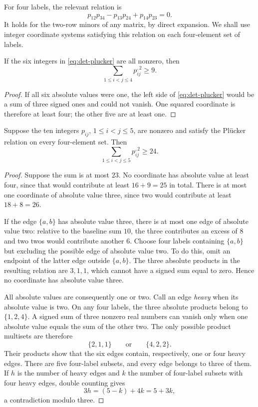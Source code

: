For four labels, the relevant relation is
\begin{equation}
 p_{12}p_{34}-p_{13}p_{24}+p_{14}p_{23}=0.
 \label{eq:det-plucker}
\end{equation}
It holds for the two-row minors of any matrix, by direct expansion.
We shall use integer coordinate systems satisfying this relation on
each four-element set of labels.

\begin{lemma}
\label{lem:det-four}
If the six integers in \eqref{eq:det-plucker} are all nonzero, then
\[
 \sum_{1\le i<j\le4}p_{ij}^{,2}\ge9.
\]
\end{lemma}
\begin{proof}
If all six absolute values were one, the left side of
\eqref{eq:det-plucker} would be a sum of three signed ones and could
not vanish. One squared coordinate is therefore at least four; the
other five are at least one.
\end{proof}

\begin{lemma}
\label{lem:det-five}
Suppose the ten integers $p_{ij}$, $1\le i<j\le5$, are nonzero and
satisfy the Pl\"ucker relation on every four-element set. Then
\begin{equation}
 \sum_{1\le i<j\le5}p_{ij}^{,2}\ge24.
 \label{eq:det-local24}
\end{equation}
\end{lemma}
\begin{proof}
Suppose the sum is at most $23$. No coordinate has absolute value at
least four, since that would contribute at least $16+9=25$ in total.
There is at most one coordinate of absolute value three, since two
would contribute at least $18+8=26$.

If the edge $\{a,b\}$ has absolute value three, there is at most one
edge of absolute value two: relative to the baseline sum $10$, the
three contributes an excess of $8$ and two twos would contribute
another $6$. Choose four labels containing $\{a,b\}$ but excluding
the possible edge of absolute value two. To do this, omit an endpoint
of the latter edge outside $\{a,b\}$. The three absolute products in
the resulting relation are $3,1,1$, which cannot have a signed sum
equal to zero. Hence no coordinate has absolute value three.

All absolute values are consequently one or two. Call an edge
\emph{heavy} when its absolute value is two. On any four labels,
the three absolute products belong to $\{1,2,4\}$. A signed sum of
three nonzero real numbers can vanish only when one absolute value
equals the sum of the other two. The only possible product multisets
are therefore
\[
 \{2,1,1\}\qquad\text{or}\qquad\{4,2,2\}.
\]
Their products show that the six edges contain, respectively, one or
four heavy edges. There are five four-label subsets, and every edge
belongs to three of them. If $h$ is the number of heavy edges and $k$
the number of four-label subsets with four heavy edges, double counting
gives
\[
 3h=(5-k)+4k=5+3k,
\]
a contradiction modulo three.
\end{proof}

